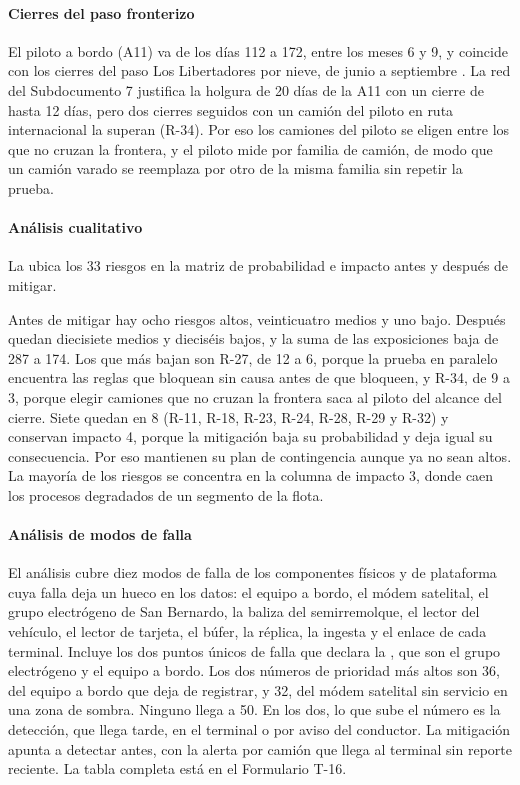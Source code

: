 \paragraph{Cierres del paso fronterizo}
El piloto a bordo (A11) va de los días 112 a 172, entre los meses 6 y 9, y coincide con los cierres del
paso Los Libertadores por nieve, de junio a septiembre . La red del
Subdocumento 7 justifica la holgura de 20 días de la A11 con un cierre de hasta 12 días, pero dos
cierres seguidos con un camión del piloto en ruta internacional la superan (R-34). Por eso los camiones
del piloto se eligen entre los que no cruzan la frontera, y el piloto mide por familia de camión, de
modo que un camión varado se reemplaza por otro de la misma familia sin repetir la prueba.

\paragraph{Análisis cualitativo}
La  ubica los 33 riesgos en la matriz de probabilidad e impacto antes y después de
mitigar.


Antes de mitigar hay ocho riesgos altos, veinticuatro medios y uno bajo. Después quedan diecisiete
medios y dieciséis bajos, y la suma de las exposiciones baja de 287 a 174. Los que más bajan son R-27, de
12 a 6, porque la prueba en paralelo encuentra las reglas que bloquean sin causa antes de que bloqueen, y
R-34, de 9 a 3, porque elegir camiones que no cruzan la frontera saca al piloto del alcance del cierre.
Siete quedan en 8 (R-11, R-18, R-23, R-24, R-28, R-29 y R-32) y conservan impacto 4, porque la
mitigación baja su probabilidad y deja igual su consecuencia. Por eso mantienen su plan de contingencia aunque ya no sean altos. La mayoría de los
riesgos se concentra en la columna de impacto 3, donde caen los procesos degradados de un segmento de la
flota.

\paragraph{Análisis de modos de falla}
El análisis cubre diez modos de falla de los componentes físicos y de plataforma cuya falla deja un hueco
en los datos: el equipo a bordo, el módem satelital, el grupo electrógeno de San Bernardo, la baliza del
semirremolque, el lector del vehículo, el lector de tarjeta, el búfer, la réplica, la ingesta y el enlace
de cada terminal. Incluye los dos puntos únicos de falla que declara la , que
son el grupo electrógeno y el equipo a bordo. Los dos números de prioridad más altos son 36, del equipo a
bordo que deja de registrar, y 32, del módem satelital sin servicio en una zona de sombra. Ninguno llega
a 50. En los dos, lo que sube el número es la detección, que llega tarde, en el terminal o por aviso del
conductor. La mitigación apunta a detectar antes, con la alerta por camión que llega
al terminal sin reporte reciente. La tabla completa está en el Formulario T-16.


